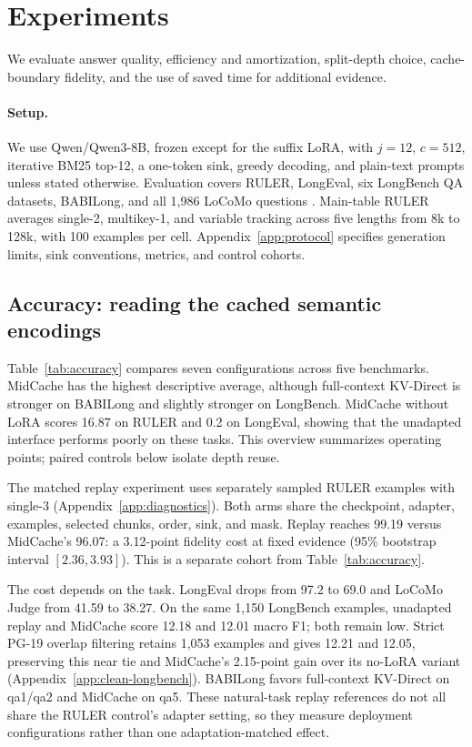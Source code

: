 \section{Experiments}
\label{sec:experiments}
We evaluate answer quality, efficiency and amortization, split-depth choice, cache-boundary fidelity, and the use of saved time for additional evidence.
\paragraph{Setup.}
We use Qwen/Qwen3-8B, frozen except for the suffix LoRA, with $j=12$, $c=512$, iterative BM25 top-12, a one-token sink, greedy decoding, and plain-text prompts unless stated otherwise. Evaluation covers RULER, LongEval, six LongBench QA datasets, BABILong, and all 1,986 LoCoMo questions \citep{ruler,longchat,longbench,babilong,locomo}. Main-table RULER averages single-2, multikey-1, and variable tracking across five lengths from 8k to 128k, with 100 examples per cell. Appendix~\ref{app:protocol} specifies generation limits, sink conventions, metrics, and control cohorts.


\subsection{Accuracy: reading the cached semantic encodings}
\label{sec:quality}
Table~\ref{tab:accuracy} compares seven configurations across five benchmarks. MidCache has the highest descriptive average, although full-context KV-Direct is stronger on BABILong and slightly stronger on LongBench. MidCache without LoRA scores 16.87 on RULER and 0.2 on LongEval, showing that the unadapted interface performs poorly on these tasks. This overview summarizes operating points; paired controls below isolate depth reuse.

The matched replay experiment uses separately sampled RULER examples with single-3 (Appendix~\ref{app:diagnostics}). Both arms share the checkpoint, adapter, examples, selected chunks, order, sink, and mask. Replay reaches 99.19 versus MidCache's 96.07: a 3.12-point fidelity cost at fixed evidence (95\% bootstrap interval $[2.36,3.93]$). This is a separate cohort from Table~\ref{tab:accuracy}.

The cost depends on the task. LongEval drops from 97.2 to 69.0 and LoCoMo Judge from 41.59 to 38.27. On the same 1,150 LongBench examples, unadapted replay and MidCache score 12.18 and 12.01 macro F1; both remain low. Strict PG-19 overlap filtering retains 1,053 examples and gives 12.21 and 12.05, preserving this near tie and MidCache's 2.15-point gain over its no-LoRA variant (Appendix~\ref{app:clean-longbench}). BABILong favors full-context KV-Direct on qa1/qa2 and MidCache on qa5. These natural-task replay references do not all share the RULER control's adapter setting, so they measure deployment configurations rather than one adaptation-matched effect.

